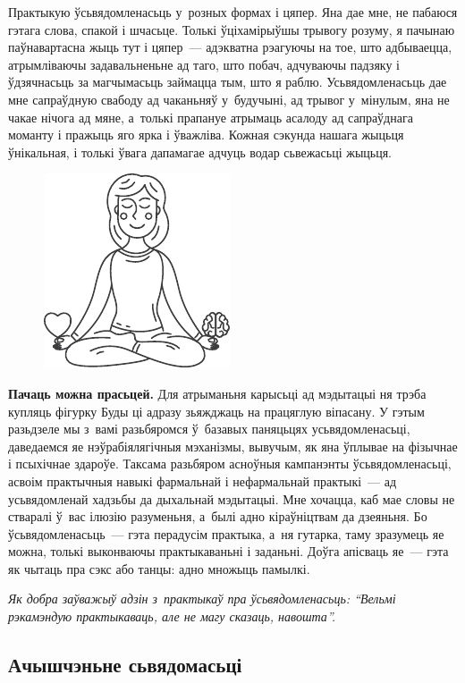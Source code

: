 Практыкую ўсьвядомленасьць у~розных формах і цяпер. Яна дае мне, не пабаюся гэтага слова, спакой і шчасьце. Толькі ўціхамірыўшы трывогу розуму, я пачынаю паўнавартасна жыць тут і цяпер~--- адэкватна рэагуючы на тое, што адбываецца, атрымліваючы задавальненьне ад таго, што побач, адчуваючы падзяку і ўдзячнасьць за магчымасьць займацца тым, што я раблю. Усьвядомленасьць дае мне сапраўдную свабоду ад чаканьняў у~будучыні, ад трывог у~мінулым, яна не чакае нічога ад мяне, а~толькі прапануе атрымаць асалоду ад сапраўднага моманту і пражыць яго ярка і ўважліва. Кожная сэкунда нашага жыцьця ўнікальная, і толькі ўвага дапамагае адчуць водар сьвежасьці жыцьця.

\begin{figure}[htb!]
  \centering
  \includegraphics[scale=1.5]{willpower/ch8/1.pdf}
\end{figure}

\textbf{Пачаць можна прасьцей.} Для атрыманьня карысьці ад мэдытацыі ня трэба купляць фігурку Буды ці адразу зьяжджаць на працяглую віпасану. У гэтым разьдзеле мы з~вамі разьбяромся ў~базавых паняцьцях усьвядомленасьці, даведаемся яе нэўрабіялягічныя мэханізмы, вывучым, як яна ўплывае на фізычнае і псыхічнае здароўе. Таксама разьбяром асноўныя кампанэнты ўсьвядомленасьці, асвоім практычныя навыкі фармальнай і нефармальнай практыкі~--- ад усьвядомленай хадзьбы да дыхальнай мэдытацыі. Мне хочацца, каб мае словы не стваралі ў~вас ілюзію разуменьня, а~былі адно кіраўніцтвам да дзеяньня. Бо ўсьвядомленасьць~--- гэта перадусім практыка, а~ня гутарка, таму зразумець яе можна, толькі выконваючы практыкаваньні і заданьні. Доўга апісваць яе~--- гэта як чытаць пра сэкс або танцы: адно множыць памылкі. 

\emph{Як добра заўважыў адзін з~практыкаў пра ўсьвядомленасьць: ``Вельмі рэкамэндую практыкаваць, але не магу сказаць, навошта''.}

\subsection*{Ачышчэньне сьвядомасьці}

